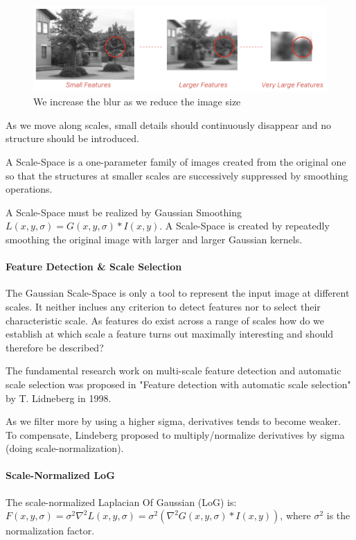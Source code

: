 \documentclass{article}
\begin{document}
\begin{figure}[htbp]
  \centering
  \includegraphics[width=0.7\linewidth]{./img/scale_space.jpg}
  \caption{We increase the blur as we reduce the image size}
  \label{fig:scale_space}
\end{figure}

As we move along scales, small details should continuously disappear and no structure should be introduced.

A Scale-Space is a one-parameter family of images created from the original one so that the structures at smaller scales are successively suppressed by smoothing operations.

A Scale-Space must be realized by Gaussian Smoothing $L(x,y,\sigma) = G(x,y,\sigma) * I(x,y)$.
A Scale-Space is created by repeatedly smoothing the original image with larger and larger Gaussian kernels.

\paragraph{Feature Detection \& Scale Selection}
The Gaussian Scale-Space is only a tool to represent the input image at different scales.
It neither inclues any criterion to detect features nor to select their characteristic scale.
As features do exist across a range of scales how do we establish at which scale a feature turns out maximally interesting and should therefore be described?

The fundamental research work on multi-scale feature detection and automatic scale selection was proposed in "Feature detection with automatic scale selection" by T. Lidneberg in 1998.

As we filter more by using a higher sigma, derivatives tends to become weaker.
To compensate, Lindeberg proposed to multiply/normalize derivatives by sigma (doing scale-normalization).

\paragraph{Scale-Normalized LoG}

The scale-normalized Laplacian Of Gaussian (LoG) is: $F(x,y,\sigma) = \sigma^2\nabla^2 L(x,y,\sigma) = \sigma^2(\nabla^2 G(x,y,\sigma) * I(x,y))$, where $\sigma^2$ is the normalization factor.
\end{document}
